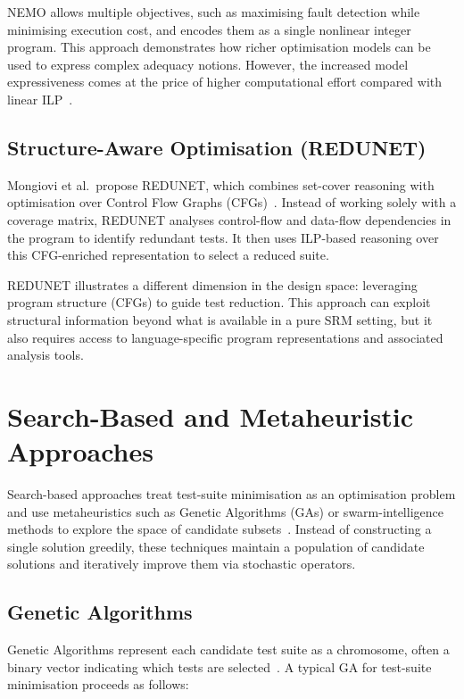 NEMO allows multiple objectives, such as maximising fault detection while
minimising execution cost, and encodes them as a single nonlinear integer
program. This approach demonstrates how richer optimisation models can be
used to express complex adequacy notions. However, the increased model
expressiveness comes at the price of higher computational effort
compared with linear ILP~\cite{lin2018}.

\subsection{Structure-Aware Optimisation (REDUNET)}

Mongiovi et al.\ propose REDUNET, which combines set-cover reasoning with
optimisation over Control Flow Graphs (CFGs)~\cite{mongiovi2020}. Instead of
working solely with a coverage matrix, REDUNET analyses control-flow and
data-flow dependencies in the program to identify redundant tests. It then
uses ILP-based reasoning over this CFG-enriched representation to select a
reduced suite.

REDUNET illustrates a different dimension in the design space: leveraging
program structure (CFGs) to guide test reduction. This approach can exploit
structural information beyond what is available in a pure SRM setting, but
it also requires access to language-specific program representations and
associated analysis tools.

\section{Search-Based and Metaheuristic Approaches}

Search-based approaches treat test-suite minimisation as an optimisation problem
and use metaheuristics such as Genetic Algorithms (GAs) or swarm-intelligence
methods to explore the space of candidate subsets~\cite{yoo2012,khan2020}.
Instead of constructing a single solution greedily, these techniques maintain
a population of candidate solutions and iteratively improve them via stochastic
operators.

\subsection{Genetic Algorithms}

Genetic Algorithms represent each candidate test suite as a chromosome, often a
binary vector indicating which tests are selected~\cite{yoo2012}. A typical GA
for test-suite minimisation proceeds as follows:

